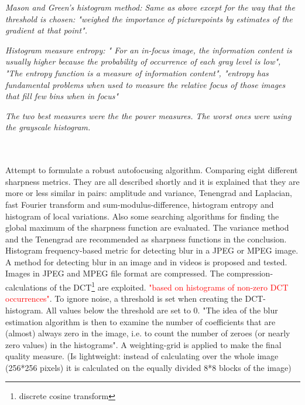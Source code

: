 \textit{Mason and Green’s histogram method: Same as above except for the way that the threshold is chosen: "weighed the importance of picturepoints by estimates of the gradient at that point".}

\textit{Histogram measure entropy: " For an in-focus image, the information content is usually higher because the probability of occurrence of each gray level is low", "The entropy function is a measure of information content", "entropy has fundamental problems when used to measure the relative focus of those images that fill few bins when in focus"}

\textit{The two best measures were the the power measures. The worst ones were using the grayscale histogram.}


\cite{jnbm09}\\
\cite{jnbm10}\\

Attempt to formulate a robust autofocusing algorithm.\cite{jnbm11} Comparing eight different sharpness metrics. They are all described shortly and it is explained that they are more or less similar in pairs: amplitude and variance, Tenengrad and Laplacian, fast Fourier transform and sum-modulus-difference, histogram entropy and histogram of local variations. Also some searching algorithms for finding the global maximum of the sharpness function are evaluated. The variance method and the Tenengrad are recommended as sharpness functions in the conclusion.\\

Histogram frequency-based metric for detecting blur in a JPEG or MPEG image.\cite{jnbm12} A method for detecting blur in an image and in videos is proposed and tested. Images in JPEG and MPEG file format are compressed. The compression-calculations of the DCT\footnote{discrete cosine transform} are exploited. \textcolor{red}{"based on histograms of non-zero DCT occurrences"}. To ignore noise, a threshold is set when creating the DCT-histogram. All values below the threshold are set to 0. "The idea of the blur estimation algorithm is then to examine the number of coefficients that are (almost) always zero in the image, i.e. to count the number of zeroes (or nearly zero values) in the histograms". A weighting-grid is applied to make the final quality measure. (Is lightweight\cite{jnbm12}: instead of calculating over the whole image (256*256 pixels) it is calculated on the equally divided 8*8 blocks of the image)\\

